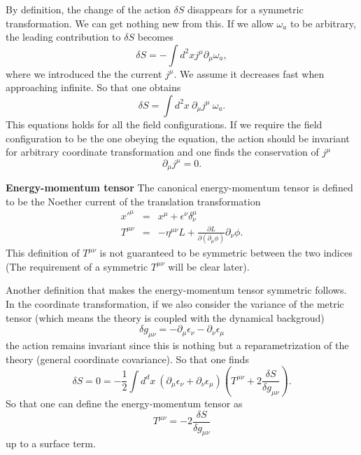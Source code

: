 \documentclass[submission, PhysLectNotes]{SciPost}
\begin{document}
By definition, the change of the action $\delta S$ disappears for a symmetric transformation. We can get nothing new from this. If we allow $\omega_a$ to be arbitrary, the leading contribution to $\delta S$ becomes
\begin{equation}
    \delta S = -\int d^2x j^\mu \partial_\mu \omega_a,
\end{equation}
where we introduced the the current $j^\mu$. We assume it decreases fast when approaching infinite. So that one obtains
\begin{equation}
    \delta S = \int d^2x\ \partial_\mu j^\mu \ \omega_a.
\end{equation}
This equations holds for all the field configurations. If we require the field configuration to be the one obeying the equation, the action should be invariant for arbitrary coordinate transformation and one finds the conservation of $j^\mu$
\begin{equation}
    \partial_\mu j^\mu = 0.
\end{equation}

{\bf Energy-momentum tensor}
The canonical energy-momentum tensor is defined to be the Noether current of the translation transformation
\begin{eqnarray}
    x'^\mu &=& x^\mu + \epsilon^\nu \delta^\mu_\nu \\
    T^{\mu\nu} &=& -\eta^{\mu\nu} L + \frac{\partial L}{\partial(\partial_\mu \phi)}\partial_\nu \phi.
\end{eqnarray}
This definition of $T^{\mu\nu}$ is not guaranteed to be symmetric between the two indices (The requirement of a symmetric $T^{\mu\nu}$ will be clear later).

Another definition that makes the energy-momentum tensor symmetric follows. In the coordinate transformation, if we also consider the variance of the metric tensor (which means the theory is coupled with the dynamical backgroud)
\begin{equation}
\delta g_{\mu\nu} = -\partial_\mu\epsilon_\nu -\partial_\nu\epsilon_\mu
\end{equation}
the action remains invariant since this is nothing but a reparametrization of the theory (general coordinate covariance). So that one finds
\begin{equation}
    \delta S = 0 = -\frac{1}{2} \int d^d x \ \left(\partial_\mu\epsilon_\nu + \partial_\nu\epsilon_\mu\right) \left(T^{\mu\nu} +2\frac{\delta S}{\delta g_{\mu\nu}}\right).
\end{equation}
So that one can define the energy-momentum tensor as
\begin{equation}
    T^{\mu\nu} = -2\frac{\delta S}{\delta g_{\mu\nu}}
\end{equation}
up to a surface term.
\end{document}
